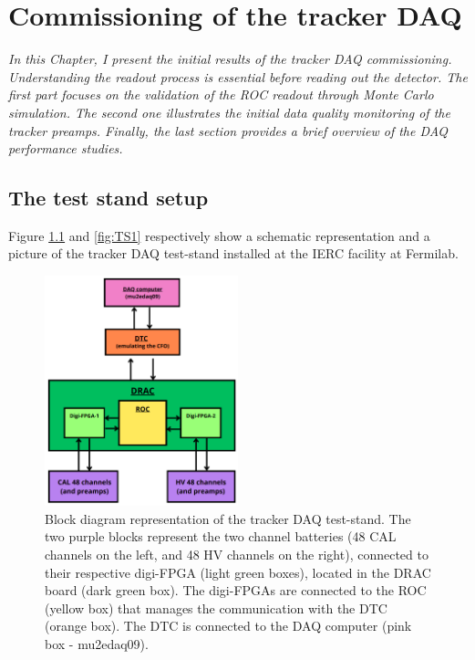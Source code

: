 \chapter{Commissioning of the tracker DAQ}
\textit{In this Chapter, I present the initial results of the tracker DAQ commissioning. 
Understanding the readout process is essential before reading out the detector. 
The first part focuses on the validation of the ROC readout through Monte Carlo simulation. 
The second one illustrates the initial data quality monitoring of the tracker preamps. 
Finally, the last section provides a brief overview of the DAQ performance studies.
}

  \section{The test stand setup}\label{des}
  Figure \ref{fig:blockdiagram} and \ref{fig:TS1} respectively show a 
  schematic representation and a picture of the tracker DAQ test-stand 
  installed at the IERC facility at Fermilab.
  
  \begin{figure}[!h]
    \centering
    \includegraphics[width =0.5\textwidth]{figures/png/Screenshot_20240712_102528.png}
    \caption{Block diagram representation of the tracker DAQ test-stand. The two purple 
    blocks represent the two channel batteries (48 CAL channels on the left, 
    and 48 HV channels on the right), connected to their respective digi-FPGA 
    (light green boxes), located in the DRAC board (dark green box). The 
    digi-FPGAs are connected to the ROC (yellow box) that manages the communication with the
    DTC (orange box). The DTC is connected to the DAQ 
    computer (pink box - mu2edaq09).}
    \label{fig:blockdiagram}
    \end{figure}



